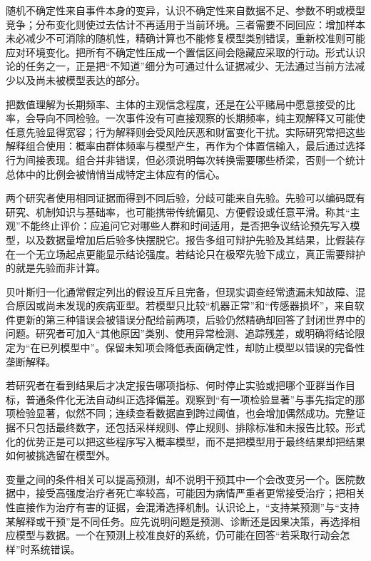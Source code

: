 随机不确定性来自事件本身的变异，认识不确定性来自数据不足、参数不明或模型竞争；分布变化则使过去估计不再适用于当前环境。三者需要不同回应：增加样本未必减少不可消除的随机性，精确计算也不能修复模型类别错误，重新校准则可能应对环境变化。把所有不确定性压成一个置信区间会隐藏应采取的行动。形式认识论的任务之一，正是把“不知道”细分为可通过什么证据减少、无法通过当前方法减少以及尚未被模型表达的部分。

把数值理解为长期频率、主体的主观信念程度，还是在公平赌局中愿意接受的比率，会导向不同检验。一次事件没有可直接观察的长期频率，纯主观解释又可能使任意先验显得宽容；行为解释则会受风险厌恶和财富变化干扰。实际研究常把这些解释组合使用：概率由群体频率与模型产生，再作为个体置信输入，最后通过选择行为间接表现。组合并非错误，但必须说明每次转换需要哪些桥梁，否则一个统计总体中的比例会被悄悄当成特定主体应有的信心。

两个研究者使用相同证据而得到不同后验，分歧可能来自先验。先验可以编码既有研究、机制知识与基础率，也可能携带传统偏见、方便假设或任意平滑。称其“主观”不能终止评价：应追问它对哪些人群和时间适用，是否把争议结论预先写入模型，以及数据量增加后后验多快摆脱它。报告多组可辩护先验及其结果，比假装存在一个无立场起点更能显示结论强度。若结论只在极窄先验下成立，真正需要辩护的就是先验而非计算。

贝叶斯归一化通常假定列出的假设互斥且完备，但现实调查经常遗漏未知故障、混合原因或尚未发现的疾病亚型。若模型只比较“机器正常”和“传感器损坏”，来自软件更新的第三种错误会被错误分配给前两项，后验仍然精确却回答了封闭世界中的问题。研究者可加入“其他原因”类别、使用异常检测、追踪残差，或明确将结论限定为“在已列模型中”。保留未知项会降低表面确定性，却防止模型以错误的完备性垄断解释。

若研究者在看到结果后才决定报告哪项指标、何时停止实验或把哪个亚群当作目标，普通条件化无法自动纠正选择偏差。观察到“有一项检验显著”与事先指定的那项检验显著，似然不同；连续查看数据直到跨过阈值，也会增加偶然成功。完整证据不只包括最终数字，还包括采样规则、停止规则、排除标准和未报告比较。形式化的优势正是可以把这些程序写入概率模型，而不是把模型用于最终结果却把结果如何被挑选留在模型外。

变量之间的条件相关可以提高预测，却不说明干预其中一个会改变另一个。医院数据中，接受高强度治疗者死亡率较高，可能因为病情严重者更常接受治疗；把相关性直接作为治疗有害的证据，会混淆选择机制。认识论上，“支持某预测”与“支持某解释或干预”是不同任务。应先说明问题是预测、诊断还是因果决策，再选择相应模型与数据。一个在预测上校准良好的系统，仍可能在回答“若采取行动会怎样”时系统错误。

